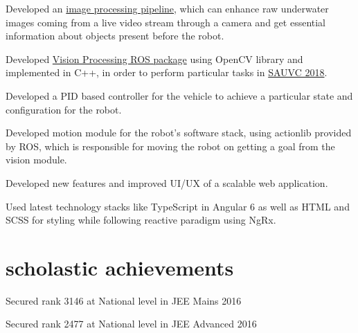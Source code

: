 \documentclass[]{deedy-resume-openfont}
\begin{document}
\begin{minipage}[t]{0.66\textwidth}
\begin{tightemize}
\item Developed an \href{https://github.com/ksakash/auv2017-1/blob/IP/task_handler_layer/ip.md}{image processing pipeline}, which can enhance raw underwater images coming from a live video stream through a camera and get essential information about objects present before the robot. 
\item Developed \href{https://github.com/ksakash/IP_SAUVC/}{Vision Processing ROS package} using OpenCV library and implemented in C++, in order to perform particular tasks in \href{https://sauvc.org/}{SAUVC 2018}.  
\item Developed a PID based controller for the vehicle to achieve a particular state and configuration for the robot.
\item Developed motion module for the robot's software stack, using actionlib provided by ROS, which is responsible for moving the robot on getting a goal from the vision module.
\end{tightemize}
\sectionsep

\begin{tightemize}
\item Developed new features and improved UI/UX of a scalable web application.
\item Used latest technology stacks like TypeScript in Angular 6 as well as HTML and SCSS for styling while following reactive paradigm using NgRx.
\end{tightemize}
\sectionsep


\section{scholastic achievements} 
\vspace{\topsep} %
\begin{tightemize}
\item Secured rank 3146 at National level in JEE Mains 2016 \\ 
\item Secured rank 2477 at National level in JEE Advanced 2016
\end{tightemize}
\sectionsep


\end{minipage}
\end{document}
